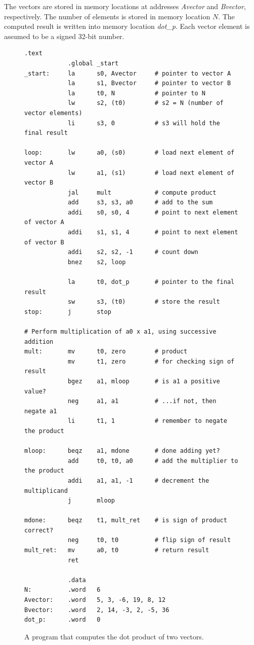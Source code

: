\documentclass[11pt, twoside, pdftex]{article}
\begin{document}
\noindent
The vectors are stored in memory locations at addresses
{\it Avector} and {\it Bvector}, respectively. The number of elements
is stored in memory location $N$. The computed result is written
into memory location {\it dot\_p}. Each vector element is assumed to be a
signed 32-bit number.

\begin{figure}[H]
\begin{lstlisting}[style=defaultNiosVStyle]
            .text
            .global _start
_start:     la      s0, Avector     # pointer to vector A
            la      s1, Bvector     # pointer to vector B
            la      t0, N           # pointer to N
            lw      s2, (t0)        # s2 = N (number of vector elements)
            li      s3, 0           # s3 will hold the final result
            
loop:       lw      a0, (s0)        # load next element of vector A
            lw      a1, (s1)        # load next element of vector B
            jal     mult            # compute product
            add     s3, s3, a0      # add to the sum
            addi    s0, s0, 4       # point to next element of vector A
            addi    s1, s1, 4       # point to next element of vector B
            addi    s2, s2, -1      # count down
            bnez    s2, loop

            la      t0, dot_p       # pointer to the final result
            sw      s3, (t0)        # store the result
stop:       j       stop

# Perform multiplication of a0 x a1, using successive addition
mult:       mv      t0, zero        # product
            mv      t1, zero        # for checking sign of result
            bgez    a1, mloop       # is a1 a positive value?
            neg     a1, a1          # ...if not, then negate a1
            li      t1, 1           # remember to negate the product

mloop:      beqz    a1, mdone       # done adding yet?
            add     t0, t0, a0      # add the multiplier to the product
            addi    a1, a1, -1      # decrement the multiplicand
            j       mloop

mdone:      beqz    t1, mult_ret    # is sign of product correct?
            neg     t0, t0          # flip sign of result
mult_ret:   mv      a0, t0          # return result
            ret

            .data
N:          .word   6
Avector:    .word   5, 3, -6, 19, 8, 12
Bvector:    .word   2, 14, -3, 2, -5, 36
dot_p:      .word   0\end{lstlisting}
	\caption{A program that computes the dot product of two vectors.}
	\label{fig:example}
\end{figure}
 
\end{document}
